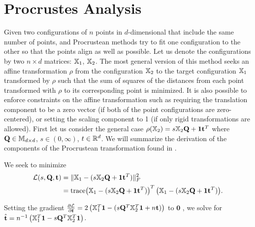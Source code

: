 \documentclass[12pt,oneside,final]{thesis}\usepackage[]{graphicx}\usepackage[]{color}
\begin{document}
\section{Procrustes Analysis}
Given two configurations of $n$ points in $d$-dimensional that include the same number of points,  and Procrustean methods try to fit one configuration to the other so that the points align as well as possible. Let us denote the configurations by two $n \times d$ matrices: ${\mathbb{X}}_1$, ${\mathbb{X}}_2$. The most general version of this  method  seeks an affine transformation $\rho$ from the configuration ${\mathbb{X}}_2$  to the target configuration ${\mathbb{X}}_1$  transformed by $\rho$ such that the sum of squares of the distances from each point transformed with $\rho$ to its corresponding point is minimized.
It is also possible to  enforce constraints on the affine transformation such as requiring the translation component to be a zero vector (if both of the point configurations are zero-centered), or setting the scaling component to 1 (if only rigid transformations are allowed). First let us consider the general case  $\rho({{\mathbb{X}}_2}) = s{\mathbb{X}}_2\mathbf{Q}+\mbox{{\bf 1}}\mathbf{t}^T$ where $\mathbf{Q} \in \mathbb{M}_{d\times d}$, $s \in (0,\infty)$, $t\in \mathbb{R}^{d}$. We will summarize the derivation of the components of the Procrustean transformation found in \cite{borg+groenen:1997}.

We seek to  minimize 
\begin{align*}
\mathcal{L}(s,\mathbf{Q},\mathbf{t}) &= \|{\mathbb{X}}_1 - (s{\mathbb{X}}_2\mathbf{Q}+\mbox{{\bf 1}} \mathbf{t}^T)\|_F^2  
\\ &= \textup{trace} {\left({\mathbb{X}}_1 - (s{\mathbb{X}}_2\mathbf{Q}+\ensuremath{\mbox{{\bf 1}}} \mathbf{t}^T) \right)^T \left({\mathbb{X}}_1 - (s{\mathbb{X}}_2\mathbf{Q}+\ensuremath{\mbox{{\bf 1}}} \mathbf{t}^T) \right)}.
\end{align*}

Setting the gradient $\frac{\partial \mathcal{L}}{\partial \bm{t}}=2 \left({\mathbb{X}}_1^T \mbox{{\bf 1}} - (s\mathbf{Q}^T {\mathbb{X}}_2^T \mbox{{\bf 1}}+ n\mathbf{t})\right)$ to $\mathbf{0}$ ,
we solve for $\hat{\mathbf{t}}= n^{-1} \left({\mathbb{X}}_1^T \mbox{{\bf 1}}  -s\mathbf{Q}^T {\mathbb{X}}_2^T \mbox{{\bf 1}} \right)$. 
\end{document}
